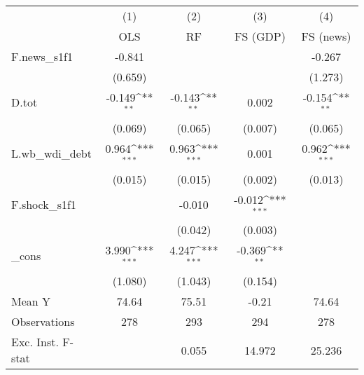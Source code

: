 {
\def\sym#1{\ifmmode^{#1}\else\(^{#1}\)\fi}
\begin{tabular}{l*{4}{c}}
\toprule
            &\multicolumn{1}{c}{(1)}&\multicolumn{1}{c}{(2)}&\multicolumn{1}{c}{(3)}&\multicolumn{1}{c}{(4)}\\
            &\multicolumn{1}{c}{OLS}&\multicolumn{1}{c}{RF}&\multicolumn{1}{c}{FS (GDP)}&\multicolumn{1}{c}{FS (news)}\\
\midrule
F.news\_s1f1 &      -0.841         &                     &                     &      -0.267         \\
            &     (0.659)         &                     &                     &     (1.273)         \\
\addlinespace
D.tot       &      -0.149\sym{**} &      -0.143\sym{**} &       0.002         &      -0.154\sym{**} \\
            &     (0.069)         &     (0.065)         &     (0.007)         &     (0.065)         \\
\addlinespace
L.wb\_wdi\_debt&       0.964\sym{***}&       0.963\sym{***}&       0.001         &       0.962\sym{***}\\
            &     (0.015)         &     (0.015)         &     (0.002)         &     (0.013)         \\
\addlinespace
F.shock\_s1f1&                     &      -0.010         &      -0.012\sym{***}&                     \\
            &                     &     (0.042)         &     (0.003)         &                     \\
\addlinespace
\_cons      &       3.990\sym{***}&       4.247\sym{***}&      -0.369\sym{**} &                     \\
            &     (1.080)         &     (1.043)         &     (0.154)         &                     \\
\midrule
Mean Y      &       74.64         &       75.51         &       -0.21         &       74.64         \\
Observations&         278         &         293         &         294         &         278         \\
Exc. Inst. F-stat&                     &       0.055         &      14.972         &      25.236         \\
\bottomrule
\end{tabular}
}
